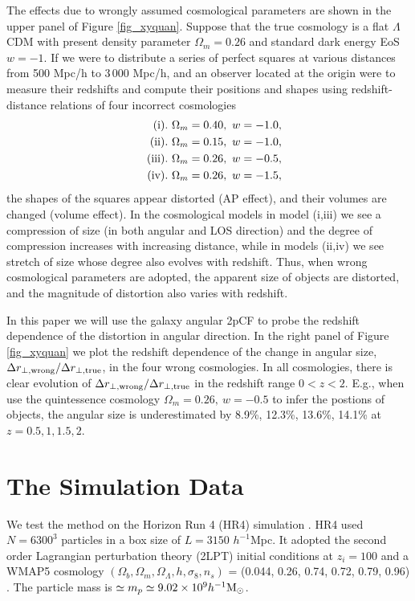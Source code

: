 \documentclass[iop]{emulateapj}
\newcommand{\hMsun}{{\ifmmode{h^{-1}{\rm
        {M_{\odot}}}}\else{$h^{-1}{\rm{M_{\odot}}}$~}\fi}}
\begin{document}
The effects due to wrongly assumed cosmological parameters are shown in the upper panel of Figure \ref{fig_xyquan}.
Suppose that the true cosmology is a flat $\Lambda$CDM with present density parameter $\Omega_m=0.26$
and standard dark energy EoS $w=-1$.
If we were to distribute a series of perfect squares at various distances from 500 Mpc/h to 3\,000 Mpc/h,
and an observer located at the origin were to measure their redshifts and compute their positions and shapes 
using redshift-distance relations of four incorrect cosmologies
\begin{eqnarray}
 & &{\rm (i)}.\ \Omega_m=0.40,\ w=-1.0, \nonumber \\ 
 & &{\rm (ii)}.\ \Omega_m=0.15,\ w=-1.0, \nonumber\\ \noindent
 & &{\rm (iii)}.\ \Omega_m=0.26,\ w=-0.5,\nonumber\\ \noindent
 & &{\rm (iv)}.\ \Omega_m=0.26,\ w=-1.5, \nonumber \noindent
\end{eqnarray}
the shapes of the squares appear distorted (AP effect),
and their volumes are changed (volume effect).
In the cosmological models in model (i,iii) we see a compression of size (in both angular and LOS direction)
and the degree of compression increases with increasing distance,
while in models (ii,iv) we see stretch of size whose degree also evolves with redshift.
Thus, when wrong cosmological parameters are adopted,
the apparent size of objects are distorted, and the magnitude of distortion also varies with redshift.

In this paper we will use the galaxy angular 2pCF to probe the redshift dependence of the distortion in angular direction.
In the right panel of Figure \ref{fig_xyquan} we plot the redshift dependence of the change in angular size, 
${\Delta r_{\bot, \rm wrong}}/{\Delta r_{\bot, \rm true}}$, in the four wrong cosmologies.
In all cosmologies, there is clear evolution of ${\Delta r_{\bot, \rm wrong}}/{\Delta r_{\bot, \rm true}}$ 
in the redshift range $0<z<2$.
E.g., when use the quintessence cosmology 
$\Omega_m=0.26,\ w=-0.5$ to infer the postions of objects,
the angular size is underestimated by 
8.9\%, 12.3\%, 13.6\%, 14.1\% 
at $z=0.5,1,1.5,2$.




\section{The Simulation Data}\label{sec:data}

We test the method on the Horizon Run 4  (HR4) simulation \citep{hr4}.
HR4 used $N=6300^3$ particles in a box size of $L={3150}$ $h^{-1}$Mpc.  
It adopted the second order Lagrangian perturbation theory (2LPT) initial conditions at $z_{i}=100$
and a WMAP5 cosmology $(\Omega_{b},\Omega_{m},\Omega_\Lambda,h,\sigma_8,n_s)$  = (0.044, 0.26, 0.74, 0.72, 0.79, 0.96) \citep[]{komatsu 2011}.
The particle mass is $\simeq m_{p} \simeq 9.02 \times 10^9 \hMsun$.
\end{document}
